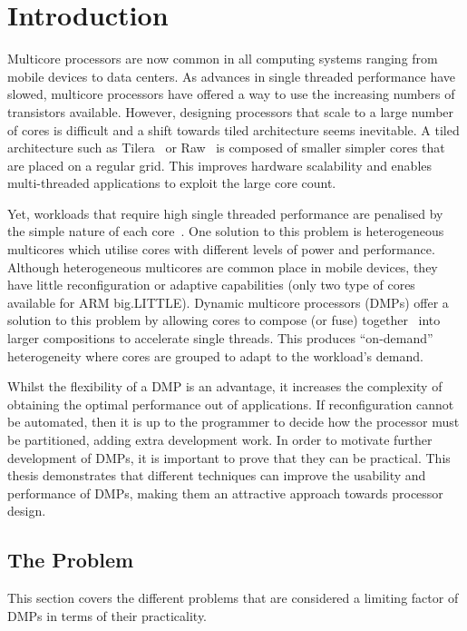 \chapter{Introduction}
Multicore processors are now common in all computing systems ranging from mobile devices to data centers.
As advances in single threaded performance have slowed, multicore processors have offered a way to use the increasing numbers of transistors available.
However, designing processors that scale to a large number of cores is difficult and a shift towards tiled architecture seems inevitable.
A tiled architecture such as Tilera~\cite{bell2008tile} or Raw~\cite{waingold1997raw} is composed of smaller simpler cores that are placed on a regular grid.
This improves hardware scalability and enables multi-threaded applications to exploit the large core count.

Yet, workloads that require high single threaded performance are penalised by the simple nature of each core~\cite{eyerman2010amdahl}.
One solution to this problem is heterogeneous multicores which utilise cores with different levels of power and performance.
Although heterogeneous multicores are common place in mobile devices, they have little reconfiguration or adaptive capabilities (\eg only two type of cores available for ARM big.LITTLE).
Dynamic multicore processors (DMPs) offer a solution to this problem by allowing cores to compose (or fuse) together~\cite{ipek2007CoreFusion} into larger compositions to accelerate single threads.
This produces ``on-demand'' heterogeneity where cores are grouped to adapt to the workload's demand.

Whilst the flexibility of a DMP is an advantage, it increases the complexity of obtaining the optimal performance out of applications.
If reconfiguration cannot be automated, then it is up to the programmer to decide how the processor must be partitioned, adding extra development work.
In order to motivate further development of DMPs, it is important to prove that they can be practical.
This thesis demonstrates that different techniques can improve the usability and performance of DMPs, making them an attractive approach towards processor design. 

\section{The Problem}
This section covers the different problems that are considered a limiting factor of DMPs in terms of their practicality.

